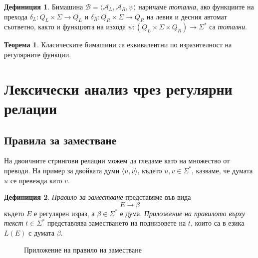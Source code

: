 \documentclass[12pt, oneside]{article}
\theoremstyle{definition}
\newtheorem{definition}{Дефиниция}[section]
\newtheorem{theorem}{Теорема}[section]
\begin{document}
\begin{definition}
	Бимашина \( \mathcal{B} = \langle \mathcal{A}_L, \mathcal{A}_R, \psi \rangle \) наричаме \emph{тотална}, ако функциите на прехода \( \delta_L: Q_L \times \Sigma \to Q_L \) и \( \delta_R: Q_R \times \Sigma \to Q_R \) на левия и десния автомат съответно, както и функцията на изхода \( \psi: (Q_L \times \Sigma \times Q_R) \to \Sigma^* \) са \emph{тотални}.
\end{definition}

\begin{theorem}
	Класическите бимашини са еквивалентни по изразителност на регулярните функции. \cite{Schutzenberger:61} \cite{Mihov:2018-2}
\end{theorem}

\pagebreak
\section{Лексически анализ чрез регулярни релации}

\subsection{Правила за заместване}

На двоичните стрингови релации можем да гледаме като на множество от преводи. На пример за двойката думи \( \langle u, v \rangle \), където \(u,v \in \Sigma^*\), казваме, че думата \( u \) се превежда като \( v \).

\begin{definition}
	\emph{Правило за заместване} представяме във вида
	\[ E \to \beta \]
	където \( E \) е регулярен израз, а \( \beta \in \Sigma^* \) е дума.
	\emph{Приложение на правилото върху текст} \( t \in \Sigma^* \) представлява заместването на поднизовете на \( t \), които са в езика \( L(E) \) с думата \( \beta \).
\end{definition}

\begin{figure}[!htb]
	\centering
	\caption{Приложение на правило на заместване}
\end{figure}
\end{document}
